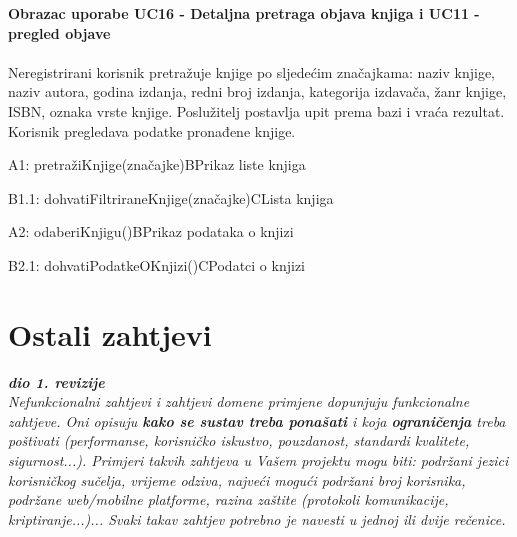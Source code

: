 				\textbf{Obrazac uporabe UC16 - Detaljna pretraga objava knjiga i UC11 - pregled objave}\\\\
				Neregistrirani korisnik pretražuje knjige po sljedećim značajkama: naziv knjige, naziv autora, godina izdanja, redni broj izdanja, kategorija izdavača, žanr knjige, ISBN, oznaka vrste knjige. Poslužitelj postavlja upit prema bazi i vraća rezultat. Korisnik pregledava podatke pronađene knjige.\\
				\begin{center}
					\begin{adjustbox}{max width=\textwidth}
						\begin{sequencediagram}
							\begin{call}{A}{1: pretražiKnjige(značajke)}{B}{Prikaz liste knjiga}
								
								\begin{call}{B}{1.1: dohvatiFiltriraneKnjige(značajke)}{C}{Lista knjiga}
								\end{call}
							\end{call}
							\postlevel
							\begin{call}{A}{2: odaberiKnjigu()}{B}{Prikaz podataka o knjizi}
								\begin{call}{B}{2.1: dohvatiPodatkeOKnjizi()}{C}{Podatci o knjizi}
								\end{call}
							\end{call}
						\end{sequencediagram}
					\end{adjustbox}
				\end{center}
				\eject
	
	
		\section{Ostali zahtjevi}
		
			\textbf{\textit{dio 1. revizije}}\\
		 
			 \textit{Nefunkcionalni zahtjevi i zahtjevi domene primjene dopunjuju funkcionalne zahtjeve. Oni opisuju \textbf{kako se sustav treba ponašati} i koja \textbf{ograničenja} treba poštivati (performanse, korisničko iskustvo, pouzdanost, standardi kvalitete, sigurnost...). Primjeri takvih zahtjeva u Vašem projektu mogu biti: podržani jezici korisničkog sučelja, vrijeme odziva, najveći mogući podržani broj korisnika, podržane web/mobilne platforme, razina zaštite (protokoli komunikacije, kriptiranje...)... Svaki takav zahtjev potrebno je navesti u jednoj ili dvije rečenice.}
			 
